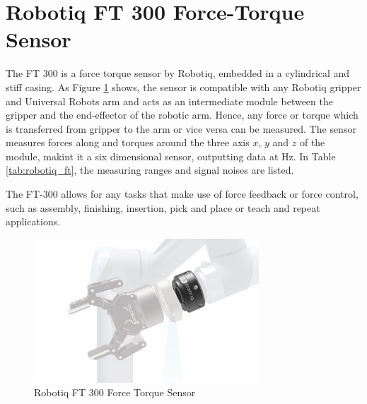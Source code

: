 \section{Robotiq FT 300 Force-Torque Sensor}
	\label{sec:ft300}
The FT 300 is a force torque sensor by Robotiq, embedded in a cylindrical and stiff casing. As Figure \ref{pics:robotiq_ft} shows, the sensor is compatible with any Robotiq gripper and Universal Robots arm and acts as an intermediate module between the gripper and the end-effector of the robotic arm. Hence, any force or torque which is transferred from gripper to the arm or vice versa can be measured. The sensor measures forces along and torques around the three axis $x$, $y$ and $z$ of the module, makint it a six dimensional sensor, outputting data at \unit[100]{Hz}. In Table \ref{tab:robotiq_ft}, the measuring ranges and signal noises are listed.

The FT-300 allows for any tasks that make use of force feedback or force control, such as assembly, finishing, insertion, pick and place or teach and repeat applications.


\begin{figure}
   \centering
   \includegraphics[width=0.75\textwidth]{images/robotiq_ft.jpg}
   \caption{Robotiq FT 300 Force Torque Sensor}
   \label{pics:robotiq_ft}
\end{figure}

